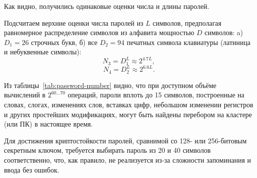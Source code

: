 \documentclass[10pt,a4paper,openany]{book}
\begin{document}
Как видно, получились одинаковые оценки числа и длины паролей.

Подсчитаем верхние оценки числа паролей из $L$ символов, предполагая равномерное распределение символов из алфавита мощностью $D$ символов: a) $D_1 = 26$ строчных букв, б) все $D_2 = 94$ печатных символа клавиатуры (латиница и небуквенные символы):
    \[ N_3 = D_1^L \approx 2^{4.7 L}, \]
    \[ N_4 = D_2^L \approx 2^{6.6 L}. \]

\begin{table}[!ht]
    \centering
    \caption{Различные верхние оценки числа паролей\label{tab:password-number}}
\end{table}

Из таблицы~\ref{tab:password-number} видно, что при доступном объёме вычислений в $2^{60 \ldots 70}$ операций, пароли вплоть до 15 символов, построенные на словах, слогах, изменениях слов, вставках цифр, небольшом изменении регистров и других простейших модификациях, могут быть найдены перебором на кластере (или ПК) в настоящее время.

Для достижения криптостойкости паролей, сравнимой со 128- или 256-битовым секретным ключом, требуется выбирать пароль из 20 и 40 символов соответственно, что, как правило, не реализуется из-за сложности запоминания и ввода без ошибок.
\end{document}
